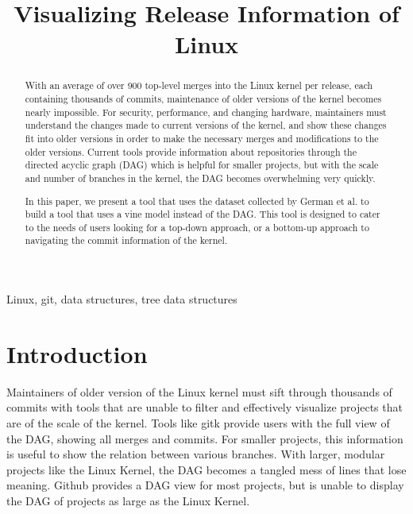 \documentclass[conference, draftclsnofoot]{IEEEtran}
\makeatletter
\newcommand{\TheTitle}{Visualizing Release Information of Linux}
\newcommand{\TheAuthors}{Evan Wilde}
\newcommand{\TheEmails}{etcwilde@uvic.ca}
\newcommand{\TheKeywords}{Linux, git, data structures, tree data structures}
\makeatother
\begin{document}
\title{\TheTitle}
\author{
\IEEEauthorblockA{\TheAuthors}
\IEEEauthorblockA{Email: \TheEmails}
}
\maketitle
\begin{abstract}

	With an average of over 900 top-level merges into the Linux kernel per
	release, each containing thousands of commits, maintenance of older
	versions of the kernel becomes nearly impossible. For security,
	performance, and changing hardware, maintainers must understand the
	changes made to current versions of the kernel, and show these changes
	fit into older versions in order to make the necessary merges and
	modifications to the older versions. Current tools provide information
	about repositories through the directed acyclic graph (DAG) which is
	helpful for smaller projects, but with the scale and number of branches
	in the kernel, the DAG becomes overwhelming very quickly.

	In this paper, we present a tool that uses the dataset collected by
	German et al. to build a tool that uses a vine model instead of the
	DAG. This tool is designed to cater to the needs of users looking for a
	top-down approach, or a bottom-up approach to navigating the commit
	information of the kernel.
\end{abstract}

\begin{IEEEkeywords}
\TheKeywords
\end{IEEEkeywords}

\section{Introduction}

Maintainers of older version of the Linux kernel must sift through thousands of
commits with tools that are unable to filter and effectively visualize projects
that are of the scale of the kernel. Tools like gitk provide users with the
full view of the DAG, showing all merges and commits. For smaller projects,
this information is useful to show the relation between various branches. With
larger, modular projects like the Linux Kernel, the DAG becomes a tangled mess
of lines that lose meaning. Github provides a DAG view for most projects, but is
unable to display the DAG of projects as large as the Linux Kernel.
\end{document}
